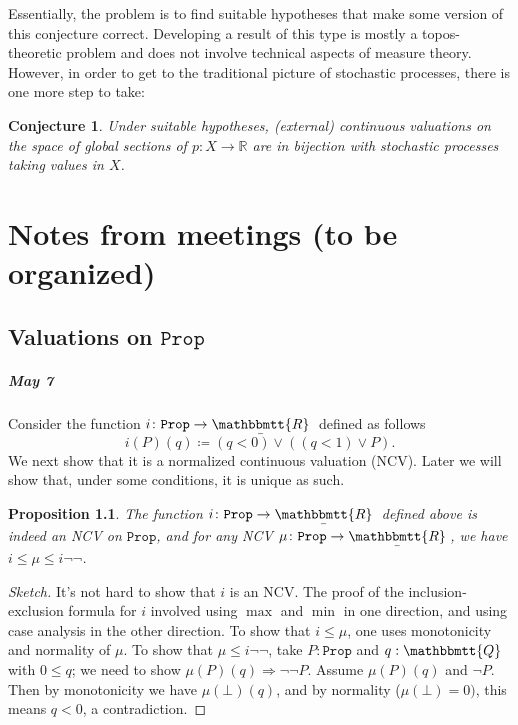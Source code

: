 \documentclass[11pt, oneside, article]{memoir}
\theoremstyle{plain}
\newtheorem{proposition}[theorem]{Proposition}
\newtheorem{conjecture}[theorem]{Conjecture}
\theoremstyle{definition}
\theoremstyle{remark}
\newcommand{\const}[1]{\mathtt{#1}}
\newcommand{\ubar}[1]{\underaccent{\bar}{#1}}
\newcommand{\internal}[1]{\raisebox{-.03ex}{$\mathbbmtt{#1}$}}
\newcommand{\hs}{\hspace{1.1pt}}
\newcommand{\RR}{\mathbb{R}}
\newcommand{\tQQ}{\internal{Q}\hs}
\newcommand{\tRR}{\internal{R}\hs}
\newcommand{\tLR}{\ubar{\tRR}\hs}
\newcommand{\Prop}{\const{Prop}}
\newcommand{\imp}{\Rightarrow}
\begin{document}
Essentially, the problem is to find suitable hypotheses that make some version of this conjecture correct. Developing a result of this type is mostly a topos-theoretic problem and does not involve technical aspects of measure theory. However, in order to get to the traditional picture of stochastic processes, there is one more step to take:

\begin{conjecture}
Under suitable hypotheses, (external) continuous valuations on the space of global sections of $p : X\to \RR$ are in bijection with stochastic processes taking values in $X$.
\end{conjecture}

\newpage
\chapter{Notes from meetings (to be organized)}

\section{Valuations on $\Prop$}
\paragraph{May 7}
Consider the function $i\colon\Prop\to\tLR$ defined as follows
\[i(P)(q)\coloneqq(q<0)\vee((q<1)\vee P).\]
We next show that it is a normalized continuous valuation (NCV). Later we will show that, under some conditions, it is unique as such.

\begin{proposition}\label{prop.sandwich}
The function $i\colon\Prop\to\tLR$ defined above is indeed an NCV on $\Prop$, and for any NCV $\mu\colon\Prop\to\tLR$, we have $i\leq\mu\leq i\neg\neg$.
\end{proposition}
\begin{proof}[Sketch]
It's not hard to show that $i$ is an NCV. The proof of the inclusion-exclusion formula for $i$ involved using $\max$ and $\min$ in one direction, and using case analysis in the other direction. To show that $i\leq\mu$, one uses monotonicity and normality of $\mu$. To show that $\mu\leq i\neg\neg$, take $P:\Prop$ and $q:\tQQ$ with $0\leq q$; we need to show $\mu(P)(q)\imp\neg\neg P$. Assume $\mu(P)(q)$ and $\neg P$. Then by monotonicity we have $\mu(\bot)(q)$, and by normality ($\mu(\bot)=0)$, this means $q<0$, a contradiction.
\end{proof}
\end{document}
